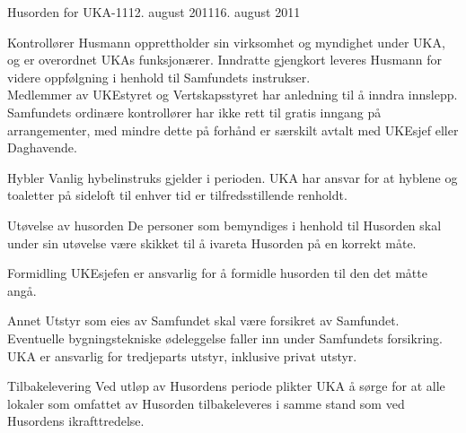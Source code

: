 \begin{instruks}{Husorden for UKA-11}{12. august 2011}{16. august 2011}
\begin{instruksledd}{Kontrollører}
Husmann opprettholder sin virksomhet og myndighet under UKA, og er
overordnet UKAs funksjonærer. Inndratte gjengkort leveres Husmann for videre
oppfølgning i henhold til Samfundets instrukser.\\

Medlemmer av UKEstyret og Vertskapsstyret har anledning til å inndra innslepp.
Samfundets ordinære kontrollører har ikke rett til gratis inngang på
arrangementer, med mindre dette på forhånd er særskilt avtalt med UKEsjef eller
Daghavende.\\
\end{instruksledd}

\begin{instruksledd}{Hybler}
Vanlig hybelinstruks gjelder i perioden. UKA har ansvar for at hyblene og
toaletter på sideloft til enhver tid er tilfredsstillende renholdt.
\end{instruksledd}

\begin{instruksledd}{Utøvelse av husorden}
De personer som bemyndiges i henhold til Husorden skal under sin utøvelse
være skikket til å ivareta Husorden på en korrekt måte.
\end{instruksledd}

\begin{instruksledd}{Formidling}
UKEsjefen er ansvarlig for å formidle husorden til den det måtte angå.
\end{instruksledd}

\begin{instruksledd}{Annet}
Utstyr som eies av Samfundet skal være forsikret av Samfundet. Eventuelle
bygningstekniske ødeleggelse faller inn under Samfundets forsikring. UKA er
ansvarlig for tredjeparts utstyr, inklusive privat utstyr.
\end{instruksledd}

\begin{instruksledd}{Tilbakelevering}
Ved utløp av Husordens periode plikter UKA å sørge for at alle lokaler som
omfattet av Husorden tilbakeleveres i samme stand som ved Husordens
ikrafttredelse.
\end{instruksledd}

\end{instruks}
